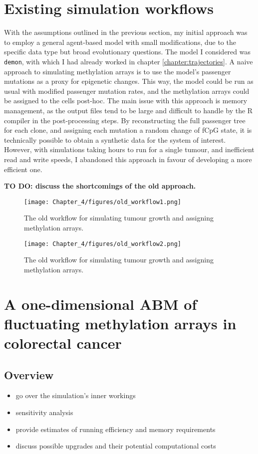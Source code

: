 \section{Existing simulation workflows}\label{section:old_famework}

With the assumptions outlined in the previous section, my initial approach was to employ a general agent-based model
with small modifications, due to the specific data type but broad evolutionary questions. The model I considered was
\texttt{demon}, with which I had already worked in chapter \ref{chapter:trajectories}. A naive approach to simulating
methylation arrays is to use the model's passenger mutations as a proxy for epigenetic changes. This way, the model
could be run as usual with modified passenger mutation rates, and the methylation arrays could be assigned to the
cells post-hoc. The main issue with this approach is memory management, as the output files tend to be large and
difficult to handle by the R compiler in the post-processing steps. By reconstructing the full passenger tree for each
clone, and assigning each mutation a random change of fCpG state, it is technically possible to obtain a synthetic data
for the system of interest. However, with simulations taking hours to run for a single tumour, and inefficient read
and write speeds, I abandoned this approach in favour of developing a more efficient one.

\textbf{TO DO: discuss the shortcomings of the old approach.}

\begin{figure}[h]
    \centering
    \texttt{[image: Chapter\_4/figures/old\_workflow1.png]}
    \caption{The old workflow for simulating tumour growth and assigning methylation arrays.}
    \label{fig:old_workflow1}
\end{figure}
\begin{figure}[h]
    \centering
    \texttt{[image: Chapter\_4/figures/old\_workflow2.png]}
    \caption{The old workflow for simulating tumour growth and assigning methylation arrays.}
    \label{fig:old_workflow2}
\end{figure}


\section{A one-dimensional ABM of fluctuating methylation arrays in colorectal cancer}\label{section:methdemon}


\subsection{Overview}
\begin{itemize}
    \item go over the simulation's inner workings
    \item sensitivity analysis
    \item provide estimates of running efficiency and memory requirements
    \item discuss possible upgrades and their potential computational costs
\end{itemize}

